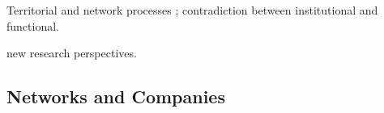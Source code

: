 Territorial and network processes ; contradiction between institutional and functional.

new research perspectives.


\subsection{Networks and Companies} 










